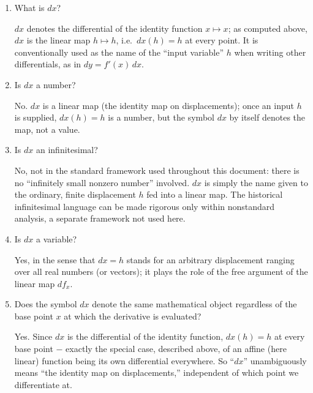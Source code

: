 \documentclass{self-check}
\begin{document}
\begin{enumerate}[resume, leftmargin=*, itemsep=8pt]

\item What is \(dx\)?
\begin{answer}
\(dx\) denotes the differential of the identity function \(x\mapsto x\); as computed above, \(dx\) is the linear map \(h\mapsto h\), i.e.\ \(dx(h)=h\) at every point. It is conventionally used as the name of the ``input variable'' \(h\) when writing other differentials, as in \(dy=f'(x)\,dx\).
\end{answer}

\item Is \(dx\) a number?
\begin{answer}
No. \(dx\) is a linear map (the identity map on displacements); once an input \(h\) is supplied, \(dx(h)=h\) is a number, but the symbol \(dx\) by itself denotes the map, not a value.
\end{answer}

\item Is \(dx\) an infinitesimal?
\begin{answer}
No, not in the standard framework used throughout this document: there is no ``infinitely small nonzero number'' involved. \(dx\) is simply the name given to the ordinary, finite displacement \(h\) fed into a linear map. The historical infinitesimal language can be made rigorous only within nonstandard analysis, a separate framework not used here.
\end{answer}

\item Is \(dx\) a variable?
\begin{answer}
Yes, in the sense that \(dx=h\) stands for an arbitrary displacement ranging over all real numbers (or vectors); it plays the role of the free argument of the linear map \(df_x\).
\end{answer}

\item Does the symbol \(dx\) denote the same mathematical object regardless of the base point \(x\) at which the derivative is evaluated?
\begin{answer}
Yes. Since \(dx\) is the differential of the identity function, \(dx(h)=h\) at every base point \(-\) exactly the special case, described above, of an affine (here linear) function being its own differential everywhere. So ``\(dx\)'' unambiguously means ``the identity map on displacements,'' independent of which point we differentiate at.
\end{answer}


\end{enumerate}
\end{document}
